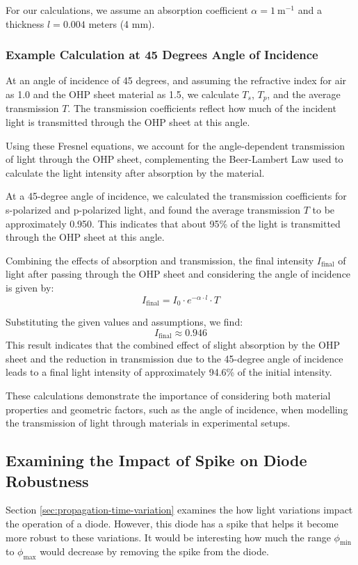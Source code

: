 For our calculations, we assume an absorption coefficient \(\alpha = 1\ \text{m}^{-1}\) and a thickness \(l = 0.004\) meters (4 mm).

\subsubsection*{Example Calculation at 45 Degrees Angle of Incidence}
At an angle of incidence of 45 degrees, and assuming the refractive index for air as 1.0 and the OHP sheet material as 1.5, we calculate \( T_s \), \( T_p \), and the average transmission \( T \). The transmission coefficients reflect how much of the incident light is transmitted through the OHP sheet at this angle.

Using these Fresnel equations, we account for the angle-dependent transmission of light through the OHP sheet, complementing the Beer-Lambert Law used to calculate the light intensity after absorption by the material.

At a 45-degree angle of incidence, we calculated the transmission coefficients for s-polarized and p-polarized light, and found the average transmission \(T\) to be approximately 0.950. This indicates that about 95\% of the light is transmitted through the OHP sheet at this angle.

Combining the effects of absorption and transmission, the final intensity \(I_{\text{final}}\) of light after passing through the OHP sheet and considering the angle of incidence is given by:
\[ I_{\text{final}} = I_0 \cdot e^{-\alpha \cdot l} \cdot T \]

Substituting the given values and assumptions, we find:
\[ I_{\text{final}} \approx 0.946 \]
This result indicates that the combined effect of slight absorption by the OHP sheet and the reduction in transmission due to the 45-degree angle of incidence leads to a final light intensity of approximately 94.6\% of the initial intensity.

These calculations demonstrate the importance of considering both material properties and geometric factors, such as the angle of incidence, when modelling the transmission of light through materials in experimental setups.


\subsection{Examining the Impact of Spike on Diode Robustness}
Section \ref{sec:propagation-time-variation} examines the how light variations impact the operation of a diode.
However, this diode has a spike that helps it become more robust to these variations. It would be interesting how much 
the range $\phi_{\text{min}}$ to $\phi_{\text{max}}$ would decrease by removing the spike from the diode.



